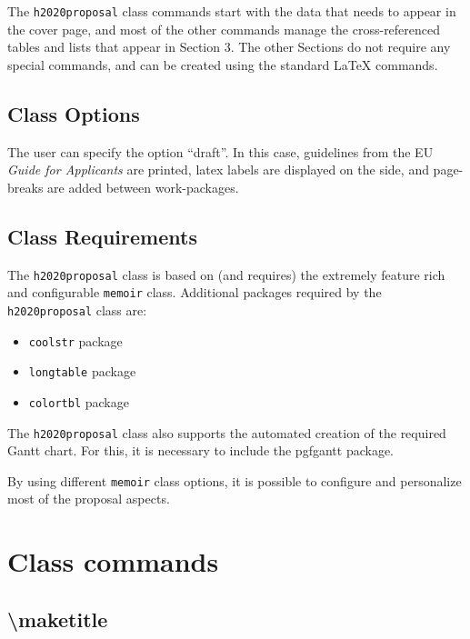 \documentclass[pdftext]{article}
\begin{document}
The \texttt{h2020proposal} class commands start with the data that needs to appear in the cover page, and most of the other commands manage the cross-referenced tables and lists that appear in Section 3. The other Sections do not require any special commands, and can be created using the standard LaTeX commands.

\subsection{Class Options}
The user can specify the option ``draft''. In this case, 
guidelines from the EU \emph{Guide for Applicants} are printed,
latex labels are displayed on the side, and page-breaks are added between work-packages.

\subsection{Class Requirements}

The \texttt{h2020proposal} class is based on (and requires) the extremely feature rich and configurable \texttt{memoir} class. Additional packages required by the \texttt{h2020proposal} class are:
\begin{itemize}
\item \texttt{coolstr} package
\item \texttt{longtable} package
\item \texttt{colortbl} package
\end{itemize}

The \texttt{h2020proposal} class also supports the automated creation of the required Gantt chart. For this, it is necessary to include the pgfgantt package.

By using different \texttt{memoir} class options, it is possible to configure and personalize most of the proposal aspects.

\section{Class commands}
\label{sec:class-commands}

\subsection{\textbackslash maketitle}
\label{sec:maketitle}
\end{document}
